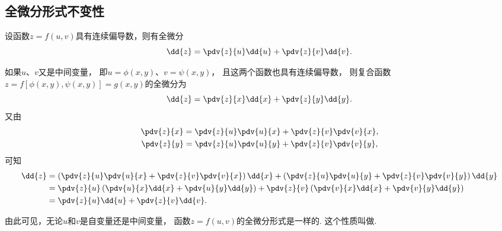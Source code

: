 \subsection{全微分形式不变性}
\begin{theorem}[全微分形式不变性]
设函数\(z=f(u,v)\)具有连续偏导数，则有全微分\begin{equation*}
	\dd{z}=\pdv{z}{u}\dd{u}+\pdv{z}{v}\dd{v}.
\end{equation*}

如果\(u\)、\(v\)又是中间变量，
即\(u=\phi(x,y)\)、\(v=\psi(x,y)\)，
且这两个函数也具有连续偏导数，
则复合函数\(z=f[\phi(x,y),\psi(x,y)]=g(x,y)\)的全微分为\begin{equation*}
	\dd{z}=\pdv{z}{x}\dd{x}+\pdv{z}{y}\dd{y}.
\end{equation*}
又由\begin{gather*}
	\pdv{z}{x} = \pdv{z}{u}\pdv{u}{x} + \pdv{z}{v}\pdv{v}{x}, \\
	\pdv{z}{y} = \pdv{z}{u}\pdv{u}{y} + \pdv{z}{v}\pdv{v}{y},
\end{gather*}
可知\begin{align*}
	\dd{z}
	&=\left(\pdv{z}{u}\pdv{u}{x} + \pdv{z}{v}\pdv{v}{x}\right)\dd{x}
	+\left(\pdv{z}{u}\pdv{u}{y} + \pdv{z}{v}\pdv{v}{y}\right)\dd{y} \\
	&=\pdv{z}{u}\left(\pdv{u}{x}\dd{x}+\pdv{u}{y}\dd{y}\right)
	+\pdv{z}{v}\left(\pdv{v}{x}\dd{x}+\pdv{v}{y}\dd{y}\right) \\
	&=\pdv{z}{u}\dd{u}+\pdv{z}{v}\dd{v}.
\end{align*}
\end{theorem}
由此可见，无论\(u\)和\(v\)是自变量还是中间变量，
函数\(z=f(u,v)\)的全微分形式是一样的.
这个性质叫做.

